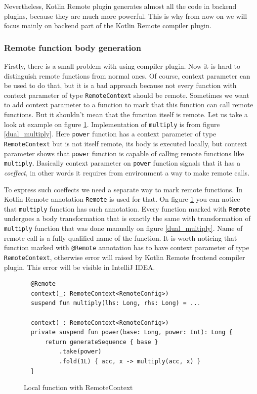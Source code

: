 \documentclass[a4paper,11pt,oneside]{article}
\newcommand{\term}[1]{\textit{#1}}
\newcommand{\kotlini}[1]{\texttt{#1}}
\begin{document}
Nevertheless, Kotlin Remote plugin generates almost all the code in backend plugins, because they are 
much more powerful. This is why from now on we will focus mainly on backend part of the Kotlin Remote 
compiler plugin.

\subsubsection{Remote function body generation}

Firstly, there is a small problem with using compiler plugin. Now it is hard to distinguish remote functions
from normal ones. Of course, context parameter can be used to do that, but it is a bad approach because not
every function with context parameter of type \kotlini{RemoteContext} should be remote. Sometimes we want
to add context parameter to a function to mark that this function can call remote functions. But it shouldn't
mean that the function itself is remote. Let us take a look at example on figure 
\ref{local_with_context_example}. Implementation of \kotlini{multiply} is from figure \ref{dual_multiply}. 
Here \kotlini{power} function has a context parameter of type \kotlini{RemoteContext} but is not itself
remote, its body is executed locally, but context parameter shows that \kotlini{power} function is capable of
calling remote functions like \kotlini{multiply}. Basically context parameter on \kotlini{power} function
signals that it has a \term{coeffect}, in other words it requires from environment a way to make remote 
calls.

To express such coeffects we need a separate way to mark remote functions. In Kotlin Remote annotation 
\kotlini{Remote} is used for that. On figure \ref{local_with_context_example} 
you can notice that \kotlini{multiply} function has such annotation. Every function marked with 
\kotlini{Remote} undergoes a body transformation that is exactly the same with transformation of 
\kotlini{multiply} function that was done manually on figure \ref{dual_multiply}. Name of
remote call is a fully qualified name of the function. It is worth noticing that function marked with
\kotlini{@Remote} annotation has to have context parameter of type \kotlini{RemoteContext}, otherwise
error will raised by Kotlin Remote frontend compiler plugin. This error will be visible in IntelliJ IDEA.

\begin{figure}[!h]
  \begin{verbatim}
  @Remote
  context(_: RemoteContext<RemoteConfig>)
  suspend fun multiply(lhs: Long, rhs: Long) = ...

  context(_: RemoteContext<RemoteConfig>)
  private suspend fun power(base: Long, power: Int): Long {
      return generateSequence { base }
          .take(power)
          .fold(1L) { acc, x -> multiply(acc, x) }
  }
  \end{verbatim}
  \caption{Local function with RemoteContext}\label{local_with_context_example}
\end{figure}
\end{document}
